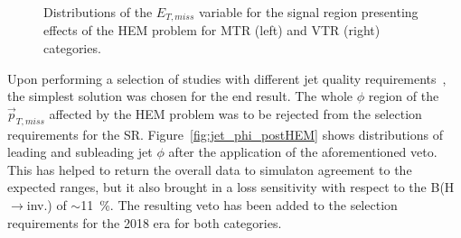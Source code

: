 \begin{figure}[htbp]
  \centering
  \caption{Distributions of the $E_{T,miss}$ variable for the signal region presenting effects of the HEM problem for MTR (left) and VTR (right) categories.  }
  \label{fig:hem_met}
\end{figure}



\hspace{10pt} Upon performing a selection of studies with different jet quality requirements~\cite{note:AN_19_257}, the simplest solution was chosen for the end result. The whole $\phi$ region of the $\vec{p}_{T, miss}$ affected by the HEM problem was to be rejected from the selection requirements for the SR. Figure~\ref{fig:jet_phi_postHEM} shows distributions of leading and subleading jet $\phi$ after the application of the aforementioned veto. This has helped to return the overall data to simulaton agreement to the expected ranges, but it also brought in a loss sensitivity with respect to the B(H$\rightarrow$inv.) of $\sim$11~\%. The resulting veto has been added to the selection requirements for the 2018 era for both categories.


